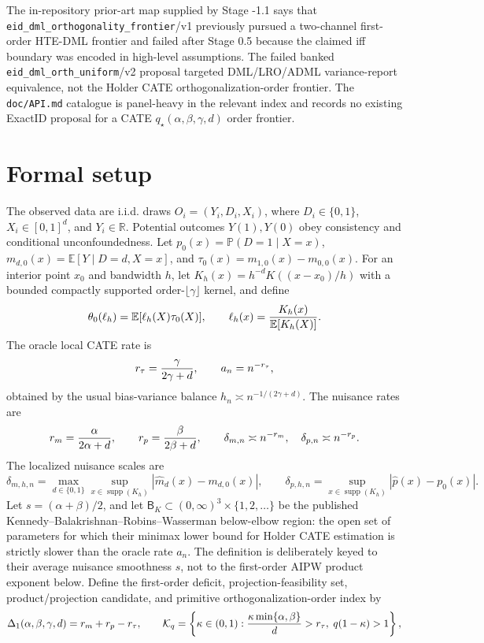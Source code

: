 \documentclass[11pt]{article}
\newcommand{\E}{\mathbb{E}}
\renewcommand{\Pr}{\mathbb{P}}
\theoremstyle{definition}
\theoremstyle{plain}
\theoremstyle{remark}
\begin{document}
The in-repository prior-art map supplied by Stage -1.1 says that
\texttt{eid\_dml\_orthogonality\_frontier}/v1 previously pursued a
two-channel first-order HTE-DML frontier and failed after Stage 0.5 because
the claimed iff boundary was encoded in high-level assumptions.  The failed
banked \texttt{eid\_dml\_orth\_uniform}/v2 proposal targeted DML/LRO/ADML
variance-report equivalence, not the Holder CATE orthogonalization-order
frontier.  The \texttt{doc/API.md} catalogue is panel-heavy in the relevant
index and records no existing ExactID proposal for a CATE
\(q_\star(\alpha,\beta,\gamma,d)\) order frontier.

\section{Formal setup}
The observed data are i.i.d. draws \(O_i=(Y_i,D_i,X_i)\), where
\(D_i\in\{0,1\}\), \(X_i\in[0,1]^d\), and \(Y_i\in\mathbb R\).  Potential
outcomes \(Y(1),Y(0)\) obey consistency and conditional unconfoundedness.
Let \(p_0(x)=\Pr(D=1\mid X=x)\), \(m_{d,0}(x)=\E[Y\mid D=d,X=x]\), and
\(\tau_0(x)=m_{1,0}(x)-m_{0,0}(x)\).  For an interior point \(x_0\) and
bandwidth \(h\), let \(K_h(x)=h^{-d}K((x-x_0)/h)\) with a bounded compactly
supported order-\(\lfloor\gamma\rfloor\) kernel, and define
\[
\theta_0(\ell_h)=\E[\ell_h(X)\tau_0(X)],\qquad
\ell_h(x)={K_h(x)\over \E[K_h(X)]}.
\]
The oracle local CATE rate is
\[
r_\tau={\gamma\over 2\gamma+d},\qquad
a_n=n^{-r_\tau},
\]
obtained by the usual bias-variance balance \(h_n\asymp n^{-1/(2\gamma+d)}\).
The nuisance rates are
\[
r_m={\alpha\over 2\alpha+d},\qquad r_p={\beta\over 2\beta+d},\qquad
\delta_{m,n}\asymp n^{-r_m},\quad \delta_{p,n}\asymp n^{-r_p}.
\]
The localized nuisance scales are
\[
\delta_{m,h,n}=\max_{d\in\{0,1\}}
\sup_{x\in\operatorname{supp}(K_h)}|\hat m_d(x)-m_{d,0}(x)|,\qquad
\delta_{p,h,n}=\sup_{x\in\operatorname{supp}(K_h)}|\hat p(x)-p_0(x)|.
\]
Let \(s=(\alpha+\beta)/2\), and let
\(\mathsf B_K\subset(0,\infty)^3\times\{1,2,\ldots\}\) be the published
Kennedy--Balakrishnan--Robins--Wasserman below-elbow region: the open set of
parameters for which their minimax lower bound for Holder CATE estimation is
strictly slower than the oracle rate \(a_n\).  The definition is deliberately
keyed to their average nuisance smoothness \(s\), not to the first-order AIPW
product exponent below.  Define the first-order deficit,
projection-feasibility set, product/projection candidate, and primitive
orthogonalization-order index by
\[
\Delta_1(\alpha,\beta,\gamma,d)=r_m+r_p-r_\tau,
\qquad
\mathcal K_q=\left\{\kappa\in(0,1):
{\kappa\min\{\alpha,\beta\}\over d}>r_\tau,\;q(1-\kappa)>1\right\},
\]
\end{document}
